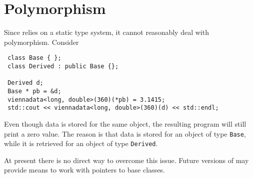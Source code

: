 \section{Polymorphism}
Since {\ViennaData} relies on a static type system, it cannot reasonably deal with polymorphism. Consider
\begin{lstlisting}
 class Base { };
 class Derived : public Base {};

 Derived d;
 Base * pb = &d;
 viennadata<long, double>(360)(*pb) = 3.1415;
 std::cout << viennadata<long, double>(360)(d) << std::endl;
\end{lstlisting}
Even though data is stored for the same object, the resulting program will still print a zero value. 
The reason is that data is stored for an object of type \lstinline|Base|, while it is retrieved for an object of type \lstinline|Derived|.

At present there is no direct way to overcome this issue. Future versions of {\ViennaData} may provide means to work with pointers to base classes.


